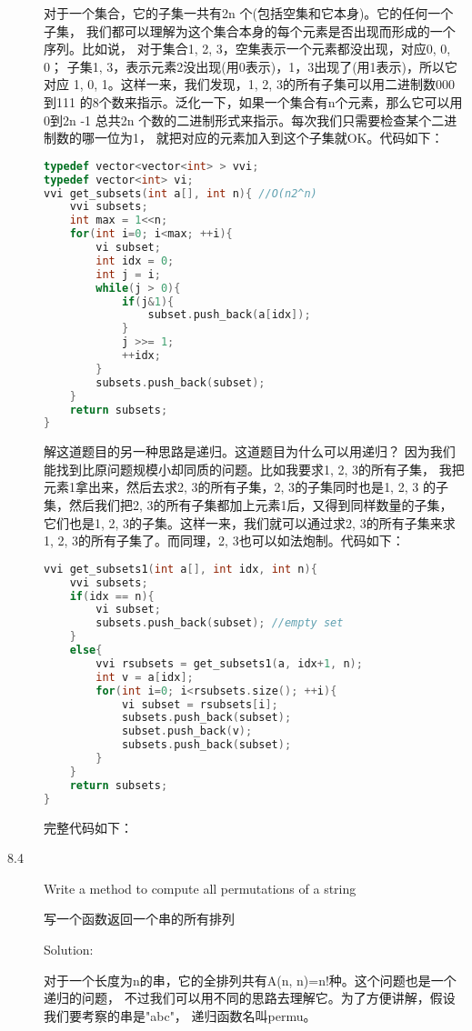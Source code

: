 \begin{description}
对于一个集合，它的子集一共有2n 个(包括空集和它本身)。它的任何一个子集， 我们都可以理解为这个集合本身的每个元素是否出现而形成的一个序列。比如说， 对于集合{1, 2, 3}，空集表示一个元素都没出现，对应{0, 0, 0}； 子集{1, 3}，表示元素2没出现(用0表示)，1，3出现了(用1表示)，所以它对应 {1, 0, 1}。这样一来，我们发现，{1, 2, 3}的所有子集可以用二进制数000到111 的8个数来指示。泛化一下，如果一个集合有n个元素，那么它可以用0到2n -1 总共2n 个数的二进制形式来指示。每次我们只需要检查某个二进制数的哪一位为1， 就把对应的元素加入到这个子集就OK。代码如下：
\begin{lstlisting}[language=C++]
typedef vector<vector<int> > vvi;
typedef vector<int> vi;
vvi get_subsets(int a[], int n){ //O(n2^n)
    vvi subsets;
    int max = 1<<n;
    for(int i=0; i<max; ++i){
        vi subset;
        int idx = 0;
        int j = i;
        while(j > 0){
            if(j&1){
                subset.push_back(a[idx]);
            }
            j >>= 1;
            ++idx;
        }
        subsets.push_back(subset);
    }
    return subsets;
}
\end{lstlisting}
解这道题目的另一种思路是递归。这道题目为什么可以用递归？ 因为我们能找到比原问题规模小却同质的问题。比如我要求{1, 2, 3}的所有子集， 我把元素1拿出来，然后去求{2, 3}的所有子集，{2, 3}的子集同时也是{1, 2, 3} 的子集，然后我们把{2, 3}的所有子集都加上元素1后，又得到同样数量的子集， 它们也是{1, 2, 3}的子集。这样一来，我们就可以通过求{2, 3}的所有子集来求 {1, 2, 3}的所有子集了。而同理，{2, 3}也可以如法炮制。代码如下：
\begin{lstlisting}[language=C++]
vvi get_subsets1(int a[], int idx, int n){
    vvi subsets;
    if(idx == n){
        vi subset;
        subsets.push_back(subset); //empty set
    }
    else{
        vvi rsubsets = get_subsets1(a, idx+1, n);
        int v = a[idx];
        for(int i=0; i<rsubsets.size(); ++i){
            vi subset = rsubsets[i];
            subsets.push_back(subset);
            subset.push_back(v);
            subsets.push_back(subset);
        }
    }
    return subsets;
}
\end{lstlisting}
完整代码如下：



\item[8.4] Write a method to compute all permutations of a string

写一个函数返回一个串的所有排列

Solution: 

对于一个长度为n的串，它的全排列共有A(n, n)=n!种。这个问题也是一个递归的问题， 不过我们可以用不同的思路去理解它。为了方便讲解，假设我们要考察的串是"abc"， 递归函数名叫permu。


\end{description}
